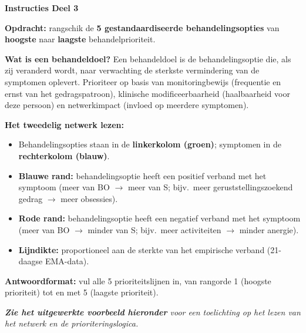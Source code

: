 \documentclass[11pt,a4paper]{article}
\begin{document}
\begin{tcolorbox}[colback=yellow!5,colframe=GoldAmber,arc=2.5mm,boxrule=0.9pt,
  left=10pt,right=10pt,top=9pt,bottom=9pt]
\textbf{\color{GoldAmber}Instructies Deel 3}

\smallskip\small
\textbf{Opdracht:} rangschik de \textbf{5 gestandaardiseerde behandelingsopties} van
\textbf{hoogste} naar \textbf{laagste} behandelprioriteit.

\textbf{Wat is een behandeldoel?}
Een behandeldoel is de behandelingsoptie die, als zij veranderd wordt, naar verwachting de
sterkste vermindering van de symptomen oplevert. Prioriteer op basis van monitoringbewijs
(frequentie en ernst van het gedragspatroon), klinische modificeerbaarheid
(haalbaarheid voor deze persoon) en netwerkimpact (invloed op meerdere symptomen).

\textbf{Het tweedelig netwerk lezen:}
\begin{itemize}[topsep=2pt,itemsep=1pt]
\item Behandelingsopties staan in de \textbf{linkerkolom (groen)}; symptomen in de \textbf{rechterkolom (blauw)}.
\item \textbf{Blauwe rand:} behandelingsoptie heeft een positief verband met het symptoom
(meer van BO $\rightarrow$ meer van S; bijv.\ meer geruststellingszoekend gedrag $\rightarrow$ meer obsessies).
\item \textbf{Rode rand:} behandelingsoptie heeft een negatief verband met het symptoom
(meer van BO $\rightarrow$ minder van S; bijv.\ meer activiteiten $\rightarrow$ minder anergie).
\item \textbf{Lijndikte:} proportioneel aan de sterkte van het empirische verband
(21-daagse EMA-data).
\end{itemize}

\textbf{Antwoordformat:} vul alle 5 prioriteitslijnen in, van rangorde 1 (hoogste prioriteit)
tot en met 5 (laagste prioriteit).

\medskip
\textit{\textbf{Zie het uitgewerkte voorbeeld hieronder} voor een toelichting op het lezen van het netwerk en de prioriteringslogica.}
\end{tcolorbox}

\vspace{0.5em}
\nopagebreak[4]
\end{document}
